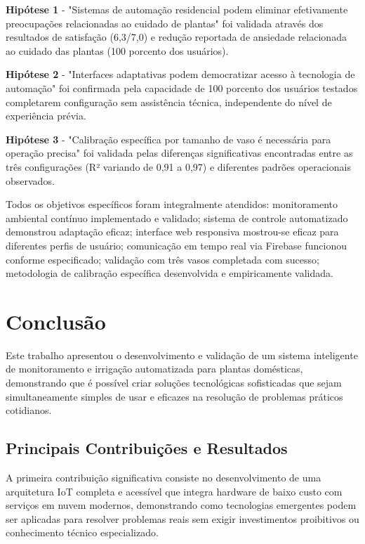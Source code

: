 \documentclass[twoside,english,brazilian]{UNISINOSmonografia}
\begin{document}
\textbf{Hipótese 1} - "Sistemas de automação residencial podem eliminar efetivamente preocupações relacionadas ao cuidado de plantas" foi validada através dos resultados de satisfação (6,3/7,0) e redução reportada de ansiedade relacionada ao cuidado das plantas (100 porcento dos usuários).

\textbf{Hipótese 2} - "Interfaces adaptativas podem democratizar acesso à tecnologia de automação" foi confirmada pela capacidade de 100 porcento dos usuários testados completarem configuração sem assistência técnica, independente do nível de experiência prévia.

\textbf{Hipótese 3} - "Calibração específica por tamanho de vaso é necessária para operação precisa" foi validada pelas diferenças significativas encontradas entre as três configurações (R² variando de 0,91 a 0,97) e diferentes padrões operacionais observados.

Todos os objetivos específicos foram integralmente atendidos: monitoramento ambiental contínuo implementado e validado; sistema de controle automatizado demonstrou adaptação eficaz; interface web responsiva mostrou-se eficaz para diferentes perfis de usuário; comunicação em tempo real via Firebase funcionou conforme especificado; validação com três vasos completada com sucesso; metodologia de calibração específica desenvolvida e empiricamente validada.

\chapter{Conclusão}

Este trabalho apresentou o desenvolvimento e validação de um sistema inteligente de monitoramento e irrigação automatizada para plantas domésticas, demonstrando que é possível criar soluções tecnológicas sofisticadas que sejam simultaneamente simples de usar e eficazes na resolução de problemas práticos cotidianos.

\section{Principais Contribuições e Resultados}

A primeira contribuição significativa consiste no desenvolvimento de uma arquitetura IoT completa e acessível que integra hardware de baixo custo com serviços em nuvem modernos, demonstrando como tecnologias emergentes podem ser aplicadas para resolver problemas reais sem exigir investimentos proibitivos ou conhecimento técnico especializado.
\end{document}
